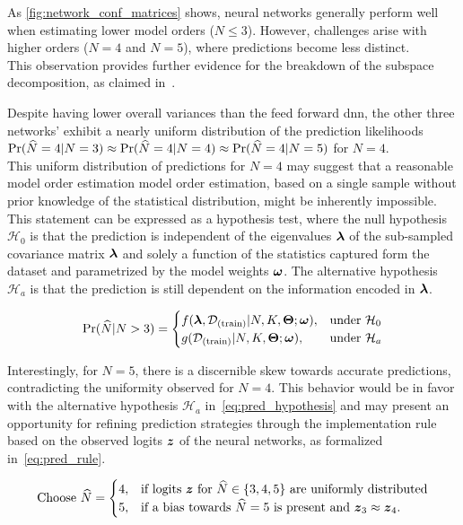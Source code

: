 As \autoref{fig:network_conf_matrices} shows, neural networks generally perform well when estimating lower model
orders (\( N \leq 3 \)). However, challenges arise with higher orders (\( N = 4 \) and \( N = 5 \)), where predictions
become less distinct. \\
This observation provides further evidence for the breakdown of the subspace decomposition, as claimed in~\cite{barthelme21sub}.

Despite having lower overall variances than the feed forward \gls{dnn}, the other three networks' exhibit a nearly uniform distribution of the
prediction likelihoods \( \Pr(\widehat{N}=4|N=3) \approx \Pr(\widehat{N}=4|N=4) \approx \Pr(\widehat{N}=4|N=5) \) for \( N = 4 \).\\
This uniform distribution of predictions for \( N = 4 \) may suggest that a reasonable model order estimation
model order estimation, based on a single sample without prior knowledge of the statistical distribution,
might be inherently impossible.
This statement can be expressed as a hypothesis test, where the null hypothesis \( \mathcal{H}_0 \) is that the
prediction is independent of the eigenvalues \( \boldsymbol{\lambda} \) of the sub-sampled covariance matrix \( \boldsymbol{\lambda} \) and solely a function
of the statistics captured form the dataset and parametrized by the model weights \( \boldsymbol{\omega} \). The alternative
hypothesis \( \mathcal{H}_a \) is that the prediction is still dependent on the information encoded in \( \boldsymbol{\lambda} \).

\begin{equation}
    \Pr(\widehat{N}|N>3) =
    \begin{cases}
    f(\boldsymbol{\lambda}, \mathcal{D}_{(\text{train})}|N, K, \boldsymbol{\Theta}; \boldsymbol{\omega}), & \text{under } \mathcal{H}_0\\
    g(\mathcal{D}_{(\text{train})}|N, K, \boldsymbol{\Theta}; \boldsymbol{\omega}), & \text{under } \mathcal{H}_a
    \end{cases}
    \label{eq:pred_hypothesis}
\end{equation}

Interestingly, for \( N = 5 \), there is a discernible skew towards accurate predictions, contradicting the uniformity
observed for \( N = 4 \). This behavior would be in favor with the alternative hypothesis \( \mathcal{H}_a \) in~\autoref{eq:pred_hypothesis}
and may present an opportunity for refining prediction strategies through the implementation rule based on the observed
logits \( \boldsymbol{z} \) of the neural networks, as formalized in~\autoref{eq:pred_rule}.

\begin{equation}
    \text{Choose } \widehat{N} = \begin{cases}
    4, & \text{if logits } \boldsymbol{z} \text{ for } \widehat{N} \in \{3,4,5\} \text{ are uniformly distributed} \\
    5, & \text{if a bias towards } \widehat{N} = 5 \text{ is present and } \boldsymbol{z}_3 \approx \boldsymbol{z}_4.
\end{cases}
\label{eq:pred_rule}
\end{equation}

